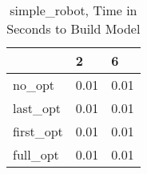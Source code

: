 \begin{table}
\caption{simple\_robot, Time in Seconds to Build Model}
\label{simple_robot_model_time}
\begin{tabular}{lll}
\toprule
 & 2 & 6 \\
\midrule
no\_opt & 0.01 & 0.01 \\
last\_opt & 0.01 & 0.01 \\
first\_opt & 0.01 & 0.01 \\
full\_opt & 0.01 & 0.01 \\
\bottomrule
\end{tabular}
\end{table}
